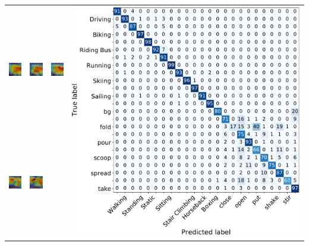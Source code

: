\documentclass[landscape,a0paper,fontscale=0.292]{baposter}
\begin{document}
\begin{poster}
{    \begin{center}
       \begin{tabular}{p{3cm}@{}p{3cm}@{}p{3cm}r}
        & & & \multirow{4}{8cm}{\includegraphics[width=0.82\linewidth]{cm}} \\ [-0.1em]
       \includegraphics[width=1\linewidth, height=15mm]{close_S4_Cheese_C1_0000000613_large}&
       \includegraphics[width=1\linewidth, height=15mm]{open_S4_CofHoney_C1_0000000149_large}&
       \includegraphics[width=1\linewidth, height=15mm]{take_S4_Cheese_C1_0000000497_large} & \\[-0.1em]
       \includegraphics[width=1\linewidth, height=15mm]{close_S4_Cheese_C1_0000000613}&
       \includegraphics[width=1\linewidth, height=15mm]{open_S4_CofHoney_C1_0000000149}&

\end{tabular}
\end{center}}
\end{poster}
\end{document}
